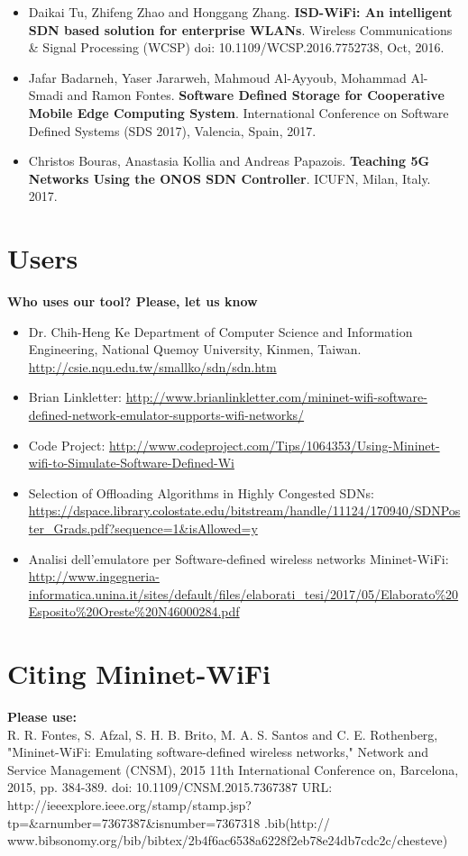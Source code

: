 \begin{itemize}
\item  Daikai Tu, Zhifeng Zhao and Honggang Zhang. \textbf{ISD-WiFi: An intelligent SDN based solution for enterprise WLANs}.  Wireless Communications \& Signal Processing (WCSP) doi: 10.1109/WCSP.2016.7752738, Oct, 2016.\\

\item Jafar Badarneh, Yaser Jararweh, Mahmoud Al-Ayyoub, Mohammad Al-Smadi and
Ramon Fontes. \textbf{Software Defined Storage for Cooperative Mobile Edge Computing System}. International Conference on Software Defined Systems (SDS 2017), Valencia, Spain, 2017.\\

\item Christos Bouras, Anastasia Kollia and Andreas Papazois. \textbf{Teaching 5G Networks Using the ONOS SDN Controller}. ICUFN, Milan, Italy. 2017.

\end{itemize}


\section{Users}
\textbf{Who uses our tool? Please, let us know}
\\

\begin{itemize}
\item Dr. Chih-Heng Ke Department of Computer Science and Information Engineering, National Quemoy University, Kinmen, Taiwan. \url{http://csie.nqu.edu.tw/smallko/sdn/sdn.htm}
\item Brian Linkletter: \url{http://www.brianlinkletter.com/mininet-wifi-software-defined-network-emulator-supports-wifi-networks/}
\item Code Project: \url{http://www.codeproject.com/Tips/1064353/Using-Mininet-wifi-to-Simulate-Software-Defined-Wi}
\item Selection of Offloading Algorithms in Highly Congested SDNs: \url{https://dspace.library.colostate.edu/bitstream/handle/11124/170940/SDNPoster_Grads.pdf?sequence=1&isAllowed=y}
\item Analisi dell’emulatore per Software-defined wireless networks Mininet-WiFi: \url{http://www.ingegneria-informatica.unina.it/sites/default/files/elaborati_tesi/2017/05/Elaborato\%20Esposito\%20Oreste\%20N46000284.pdf}
\end{itemize}


\section{Citing Mininet-WiFi}
\textbf{Please use:}
\\
R. R. Fontes, S. Afzal, S. H. B. Brito, M. A. S. Santos and C. E. Rothenberg, "Mininet-WiFi: Emulating software-defined wireless networks," Network and Service Management (CNSM), 2015 11th International Conference on, Barcelona, 2015, pp. 384-389. doi: 10.1109/CNSM.2015.7367387 URL: http://ieeexplore.ieee.org/stamp/stamp.jsp?tp=\&arnumber=7367387\&isnumber=7367318
.bib(http://\\www.bibsonomy.org/bib/bibtex/2b4f6ac6538a6228f2eb78e24db7cdc2c/chesteve)

